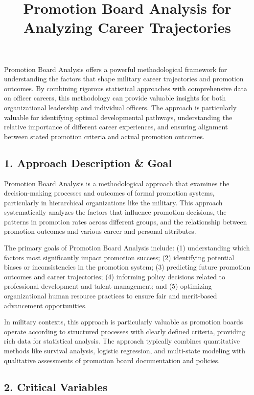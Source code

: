 \documentclass[
  letterpaper,
  DIV=11,
  numbers=noendperiod]{scrartcl}
\title{Promotion Board Analysis for Analyzing Career Trajectories}
\author{}
\date{}
\begin{document}
\maketitle


Promotion Board Analysis offers a powerful methodological framework for
understanding the factors that shape military career trajectories and
promotion outcomes. By combining rigorous statistical approaches with
comprehensive data on officer careers, this methodology can provide
valuable insights for both organizational leadership and individual
officers. The approach is particularly valuable for identifying optimal
developmental pathways, understanding the relative importance of
different career experiences, and ensuring alignment between stated
promotion criteria and actual promotion outcomes.

\subsection{1. Approach Description \&
Goal}\label{approach-description-goal}

Promotion Board Analysis is a methodological approach that examines the
decision-making processes and outcomes of formal promotion systems,
particularly in hierarchical organizations like the military. This
approach systematically analyzes the factors that influence promotion
decisions, the patterns in promotion rates across different groups, and
the relationship between promotion outcomes and various career and
personal attributes.

The primary goals of Promotion Board Analysis include: (1) understanding
which factors most significantly impact promotion success; (2)
identifying potential biases or inconsistencies in the promotion system;
(3) predicting future promotion outcomes and career trajectories; (4)
informing policy decisions related to professional development and
talent management; and (5) optimizing organizational human resource
practices to ensure fair and merit-based advancement opportunities.

In military contexts, this approach is particularly valuable as
promotion boards operate according to structured processes with clearly
defined criteria, providing rich data for statistical analysis. The
approach typically combines quantitative methods like survival analysis,
logistic regression, and multi-state modeling with qualitative
assessments of promotion board documentation and policies.

\subsection{2. Critical Variables}\label{critical-variables}
\end{document}
